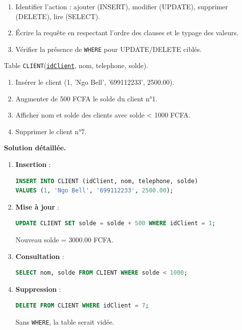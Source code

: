 \documentclass[11pt]{article}
\begin{document}
\begin{methode}
\begin{enumerate}
\item Identifier l'action : ajouter (INSERT), modifier (UPDATE), supprimer (DELETE), lire (SELECT).
\item Écrire la requête en respectant l'ordre des clauses et le typage des valeurs.
\item Vérifier la présence de \texttt{WHERE} pour UPDATE/DELETE ciblés.
\end{enumerate}
\end{methode}

\begin{exoresolu}
Table \texttt{CLIENT}(\underline{\texttt{idClient}}, nom, telephone, solde).
\begin{enumerate}
\item Insérer le client (1, 'Ngo Bell', '699112233', 2500.00).
\item Augmenter de 500 FCFA le solde du client n°1.
\item Afficher nom et solde des clients avec solde < 1000 FCFA.
\item Supprimer le client n°7.
\end{enumerate}
\tcblower
\textbf{Solution détaillée.}
\begin{enumerate}
\item \textbf{Insertion} :
\begin{lstlisting}[language=SQL]
INSERT INTO CLIENT (idClient, nom, telephone, solde)
VALUES (1, 'Ngo Bell', '699112233', 2500.00);
\end{lstlisting}
\item \textbf{Mise à jour} :
\begin{lstlisting}[language=SQL]
UPDATE CLIENT SET solde = solde + 500 WHERE idClient = 1;
\end{lstlisting}
Nouveau solde = 3000.00 FCFA.
\item \textbf{Consultation} :
\begin{lstlisting}[language=SQL]
SELECT nom, solde FROM CLIENT WHERE solde < 1000;
\end{lstlisting}
\item \textbf{Suppression} :
\begin{lstlisting}[language=SQL]
DELETE FROM CLIENT WHERE idClient = 7;
\end{lstlisting}
Sans \texttt{WHERE}, la table serait vidée.
\end{enumerate}
\end{exoresolu}
\end{document}
